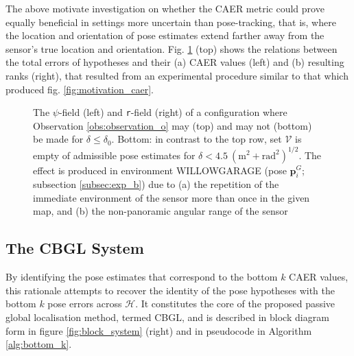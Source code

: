 The above motivate investigation on whether the CAER metric could prove equally
beneficial in settings more uncertain than pose-tracking, that is, where the
location and orientation of pose estimates extend farther away from the
sensor's true location and orientation. Fig. \ref{fig:h_and_h_not_fig} (top)
shows the relations between the total errors of hypotheses and
their (a) CAER values (left) and (b) resulting ranks (right),
that resulted from an experimental procedure similar to that which produced fig.
\ref{fig:motivation_caer}.

\begin{figure}\vspace{-0.2cm}
  
  \vspace{0.3cm}
  \caption{\small The $\psi$-field (left) and \texttt{r}-field (right) of a
           configuration where Observation \ref{obs:observation_o} may (top)
           and may not (bottom) be made for $\delta \leq \delta_0$. Bottom:
           in contrast to the top row, set $\mathcal{V}$ is empty of admissible
           pose estimates for $\delta < 4.5 \ (\text{m}^2 +
           \text{rad}^2)^{1/2}$. The effect is produced in environment
           WILLOWGARAGE (pose $\bm{p}_{i}^G$; subsection \ref{subsec:exp_b})
           due to (a) the repetition of the immediate environment of the sensor
           more than once in the given map, and (b) the non-panoramic angular
           range of the sensor}
  \vspace{-0.5cm}
  \label{fig:h_and_h_not_fig}
\end{figure}


\subsection{The CBGL System}



By identifying the pose estimates that correspond to the bottom $k$ CAER
values, this rationale attempts to recover the identity of the pose hypotheses
with the bottom $k$ pose errors across $\mathcal{H}$. It constitutes the core
of the proposed passive global localisation method, termed CBGL, and is
described in block diagram form in figure \ref{fig:block_system} (right) and in
pseudocode in Algorithm
\ref{alg:bottom_k}.

